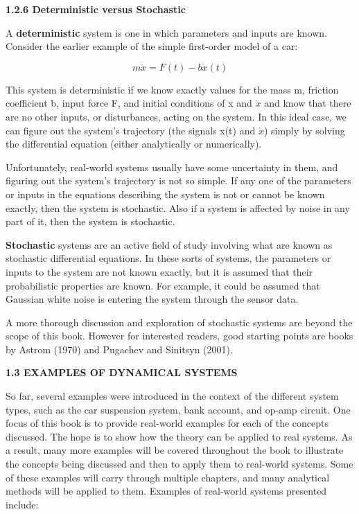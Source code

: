 \documentclass[12pt]{article}
\begin{document}
\hfill

\textbf{1.2.6 Deterministic versus Stochastic}

\hfill

A \textbf{deterministic} system is one in which parameters and inputs are known.
Consider the earlier example of the simple first-order model of a car:

\[
m \ddot{x} = F(t) - b \dot{x} (t)
\]

This system is deterministic if we know exactly values for the mass m,
friction coefficient b, input force F, and initial conditions of x and $\dot{x}$ and
know that there are no other inputs, or disturbances, acting on the system.
In this ideal case, we can figure out the system’s trajectory (the signals x(t)
and $\dot{x}$) simply by solving the differential equation (either analytically or
numerically).

Unfortunately, real-world systems usually have some uncertainty in
them, and figuring out the system’s trajectory is not so simple. If any one of
the parameters or inputs in the equations describing the system is not or
cannot be known exactly, then the system is stochastic. Also if a system is
affected by noise in any part of it, then the system is stochastic.

\textbf{Stochastic} systems are an active field of study involving what are known
as stochastic differential equations. In these sorts of systems, the parameters or
inputs to the system are not known exactly, but it is assumed that their
probabilistic properties are known. For example, it could be assumed that
Gaussian white noise is entering the system through the sensor data.


A more thorough discussion and exploration of stochastic systems are
beyond the scope of this book. However for interested readers, good
starting points are books by Astrom (1970) and Pugachev and Sinitsyn
(2001).

\hfill

\textbf{1.3 EXAMPLES OF DYNAMICAL SYSTEMS}

\hfill

So far, several examples were introduced in the context of the different
system types, such as the car suspension system, bank account, and op-amp
circuit. One focus of this book is to provide real-world examples for each of
the concepts discussed. The hope is to show how the theory can be applied
to real systems. As a result, many more examples will be covered
throughout the book to illustrate the concepts being discussed and then to
apply them to real-world systems. Some of these examples will carry
through multiple chapters, and many analytical methods will be applied to
them. Examples of real-world systems presented include:
\end{document}
